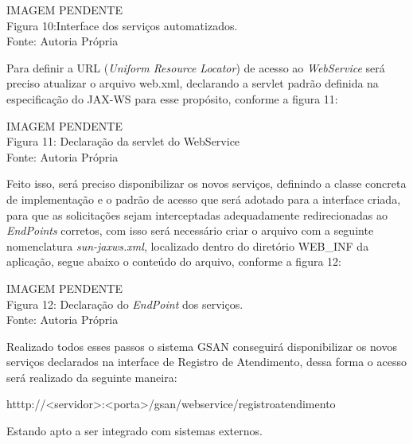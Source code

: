 \begin{center}
	IMAGEM PENDENTE \\
	Figura 10:Interface dos serviços automatizados. \\
	Fonte: Autoria Própria	\\
\end{center}

Para definir a URL (\textit{Uniform Resource Locator}) de acesso ao \textit{WebService} será preciso atualizar o arquivo web.xml, declarando a servlet padrão definida na especificação do JAX-WS para esse propósito, conforme a figura 11:

\begin{center}
	IMAGEM PENDENTE \\
	Figura 11:  Declaração da servlet do WebService\\
	Fonte: Autoria Própria\\	
\end{center}

Feito isso, será preciso disponibilizar os novos serviços, definindo a classe concreta de implementação e o padrão de acesso que será adotado para a interface criada, para que as solicitações sejam interceptadas adequadamente redirecionadas ao \textit{EndPoints} corretos, com isso será necessário criar o arquivo com a seguinte nomenclatura \textit{sun-jaxws.xml}, localizado dentro do diretório WEB\_INF da aplicação, segue abaixo o conteúdo do arquivo, conforme a figura 12:

\begin{center}
	IMAGEM PENDENTE \\
	Figura 12: Declaração do \textit{EndPoint} dos serviços.\\
	Fonte: Autoria Própria \\		
\end{center}

Realizado todos esses passos o sistema GSAN conseguirá disponibilizar os novos serviços declarados na interface de Registro de Atendimento, dessa forma o acesso será realizado da seguinte maneira:

\begin{description}
	\item htttp://<servidor>:<porta>/gsan/webservice/registroatendimento
\end{description}

Estando apto a ser integrado com sistemas externos. 